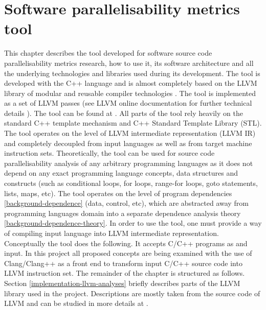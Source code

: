 \chapter{Software parallelisability metrics tool} \label{ppar-tool}
\qquad This chapter describes the tool developed for software source code parallelisability metrics research, how to use it, its software architecture and all the underlying technologies and libraries used during its development. \newline\null\qquad The tool is developed with the C++ language and is almost completely based on the \textsc{LLVM} library of modular and reusable compiler technologies \cite{llvm-paper} \cite{llvm-official-website}. The tool is implemented as a set of LLVM passes (see LLVM online documentation for further technical details \cite{llvm-online-docs}). The tool can be found at \cite{ppar-tool}. All parts of the tool rely heavily on the standard C++ template mechanism and C++ Standard Template Library (STL). \newline \null\qquad The tool operates on the level of LLVM intermediate representation \cite{llvm-online-docs-ir} (LLVM IR) and completely decoupled from input languages as well as from target machine instruction sets. Theoretically, the tool can be used for source code parallelisability analysis of any arbitrary programming languages as it does not depend on any exact programming language concepts, data structures and constructs (such as conditional loops, for loops, range-for loops, goto statements, lists, maps, etc). The tool operates on the level of program dependencies \ref{background-dependence} (data, control, etc), which are abstracted away from programming languages domain into a separate dependence analysis theory \ref{background-dependence-theory}. In order to use the tool, one must provide a way of compiling input language into LLVM intermediate representation. \newline \null\qquad Conceptually the tool does the following. It accepts C/C++ programs as and input. \newline \null\qquad In this project all proposed concepts are being examined with the use of Clang/Clang++ as a front end to transform input C/C++ source code into LLVM instruction set. \newline\null\qquad The remainder of the chapter is structured as follows. Section \ref{implementation-llvm-analyses} briefly describes parts of the LLVM library used in the project. Descriptions are mostly taken from the source code of LLVM and can be studied in more details at \cite{llvm-doxygen-docs}.     


